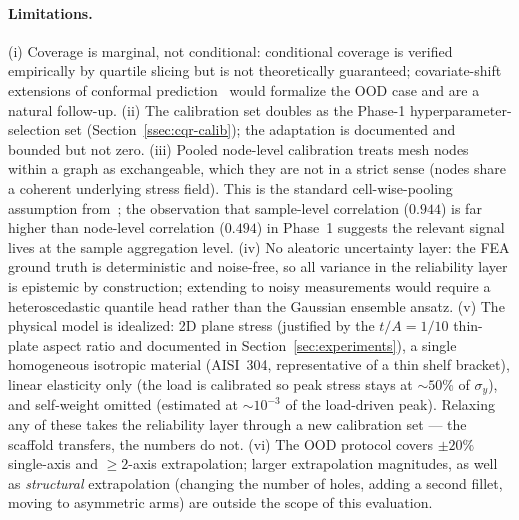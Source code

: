 \documentclass[11pt]{article}
\begin{document}
\paragraph{Limitations.}
(i) Coverage is marginal, not conditional: conditional coverage is
verified empirically by quartile slicing but is not theoretically
guaranteed; covariate-shift extensions of conformal
prediction~\cite{angelopoulos2023conformal} would formalize the OOD case
and are a natural follow-up.
(ii) The calibration set doubles as the Phase-1 hyperparameter-selection
set (Section~\ref{ssec:cqr-calib}); the adaptation is documented and
bounded but not zero.
(iii) Pooled node-level calibration treats mesh nodes within a graph as
exchangeable, which they are not in a strict sense (nodes share a
coherent underlying stress field). This is the standard
cell-wise-pooling assumption from~\cite{gopakumar2024conformal}; the
observation that sample-level correlation ($0.944$) is far higher than
node-level correlation ($0.494$) in Phase~1 suggests the relevant
signal lives at the sample aggregation level.
(iv) No aleatoric uncertainty layer: the FEA ground truth is deterministic
and noise-free, so all variance in the reliability layer is epistemic by
construction; extending to noisy measurements would require a
heteroscedastic quantile head rather than the Gaussian ensemble ansatz.
(v) The physical model is idealized: 2D plane stress (justified by the
$t/A = 1/10$ thin-plate aspect ratio and documented in
Section~\ref{sec:experiments}), a single homogeneous isotropic material
(AISI~304, representative of a thin shelf bracket), linear elasticity
only (the load is calibrated so peak stress stays at $\sim 50\%$ of
$\sigma_y$), and self-weight omitted (estimated at $\sim 10^{-3}$ of the
load-driven peak). Relaxing any of these takes the reliability layer
through a new calibration set --- the scaffold transfers, the numbers do
not. (vi) The OOD protocol covers $\pm 20\%$ single-axis and
$\geq 2$-axis extrapolation; larger extrapolation magnitudes, as well as
\emph{structural} extrapolation (changing the number of holes, adding a
second fillet, moving to asymmetric arms) are outside the scope of this
evaluation.
\end{document}

